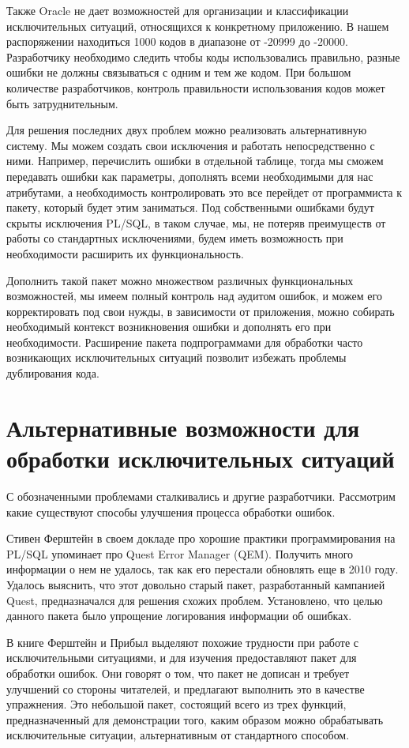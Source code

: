 Также Oracle не дает возможностей для организации и классификации исключительных ситуаций, относящихся к конкретному приложению. В нашем распоряжении находиться 1000 кодов в диапазоне от -20999 до -20000. Разработчику необходимо следить чтобы коды использовались правильно, разные ошибки не должны связываться с одним и тем же кодом\cite[с.~154]{ferstein}. При большом количестве разработчиков, контроль правильности использования кодов может быть затруднительным.

Для решения последних двух проблем можно реализовать альтернативную систему. Мы можем создать свои исключения и работать непосредственно с ними. Например, перечислить ошибки в отдельной таблице, тогда мы сможем передавать ошибки как параметры, дополнять всеми необходимыми для нас атрибутами, а необходимость контролировать это все перейдет от программиста к пакету, который будет этим заниматься. Под собственными ошибками будут скрыты исключения PL/SQL, в таком случае, мы, не потеряв преимуществ от работы со стандартных исключениями, будем иметь возможность при необходимости расширить их функциональность\cite{kite}. 

Дополнить такой пакет можно множеством различных функциональных возможностей, мы имеем полный контроль над аудитом ошибок, и можем его корректировать под свои нужды, в зависимости от приложения, можно собирать необходимый контекст возникновения ошибки и дополнять его при необходимости. Расширение пакета подпрограммами для обработки часто возникающих исключительных ситуаций позволит избежать проблемы дублирования кода. 


\section{Альтернативные возможности для обработки исключительных ситуаций}\label{ch2:sec2}

С обозначенными проблемами сталкивались и другие разработчики. Рассмотрим какие существуют способы улучшения процесса обработки ошибок. 

Стивен Ферштейн в своем докладе \cite{BestPracticePLSQL} про хорошие практики программирования на PL/SQL упоминает про Quest Error Manager (QEM). Получить много информации о нем не удалось, так как его перестали обновлять еще в 2010 году. Удалось выяснить, что этот довольно старый пакет, разработанный кампанией Quest, предназначался для решения схожих проблем. Установлено, что целью данного пакета было упрощение логирования информации об ошибках. 

В книге \cite{ferstein} Ферштейн и Прибыл выделяют похожие трудности при работе с исключительными ситуациями, и для изучения предоставляют пакет для обработки ошибок. Они говорят о том, что пакет не дописан и требует улучшений со стороны читателей, и предлагают выполнить это в качестве упражнения. Это небольшой пакет, состоящий всего из трех функций, предназначенный для демонстрации того, каким образом можно обрабатывать исключительные ситуации, альтернативным от стандартного способом. 

